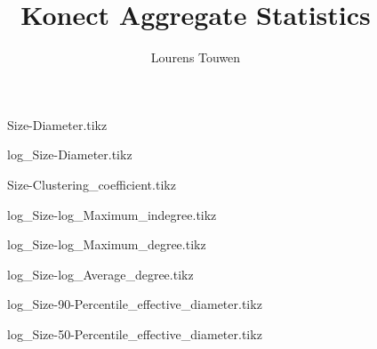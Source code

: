 \documentclass[fleqn]{article}
\title{Konect Aggregate Statistics}
\author{Lourens Touwen}
\begin{document}
	
	\pagestyle{plain}
	
	\maketitle
	
	\newlength\fheight 
	\newlength\fwidth 
	\setlength{} 
	\setlength{}
	
	
	\begin{figure}[!htb]
		\centering
		
		\caption{Size-Diameter.tikz}
	\end{figure}

	\begin{figure}[!htb]
		\centering
		
		\caption{log\_Size-Diameter.tikz}
	\end{figure}

	\begin{figure}[!htb]
		\centering
		
		\caption{Size-Clustering\_coefficient.tikz}
	\end{figure}
	
	\begin{figure}[!htb]
		\centering
		
		\caption{log\_Size-log\_Maximum\_indegree.tikz}
	\end{figure}	

	\begin{figure}[!htb]
		\centering
		
		\caption{log\_Size-log\_Maximum\_degree.tikz}
	\end{figure}
	
	\begin{figure}[!htb]
		\centering
		
		\caption{log\_Size-log\_Average\_degree.tikz}
	\end{figure}

	\begin{figure}[!htb]
		\centering
		
		\caption{log\_Size-90-Percentile\_effective\_diameter.tikz}
	\end{figure}
	
	\begin{figure}[!htb]
		\centering
		
		\caption{log\_Size-50-Percentile\_effective\_diameter.tikz}
	\end{figure}
\end{document}
